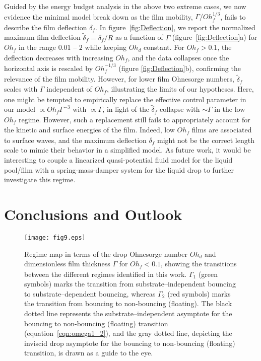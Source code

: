 \documentclass[]{jfm}
\newcommand{\Ohd}{\mathit{Oh}_\mathit{d}}
\newcommand{\Ohf}{\mathit{Oh}_\mathit{f}}
\begin{document}
Guided by the energy budget analysis in the above two extreme cases, we now evidence the minimal model break down as the film mobility, $\Gamma/\Ohf^{1/3}$, fails to describe the film deflection $\delta_f$. 
In figure~\ref{fig:Deflection}, we report the normalized maximum film deflection $\tilde{\delta}_f = \delta_f/R$ as a function of $\Gamma$ (figure~\ref{fig:Deflection}a) for $\Ohf$ in the range $0.01$ -- $2$ while keeping $\Ohd$ constant.
For $\Ohf > 0.1$, the deflection decreases with increasing $\Ohf$, and the data collapses once the horizontal axis is rescaled by $\Ohf^{-1/3}$ (figure \ref{fig:Deflection}b), confirming the relevance of the film mobility.
However, for lower film Ohnesorge numbers, $\tilde{\delta}_f$ scales with $\Gamma$ independent of $\Ohf$, illustrating the limits of our hypotheses.
Here, one might be tempted to empirically replace the effective control parameter in our model $\propto \Ohf\Gamma^{-3}$ with $\propto \Gamma$, in light of the $\tilde{\delta}_f$ collapse with $\sim \Gamma$ in the low $\Ohf$ regime. However, such a replacement still fails to appropriately account for the kinetic and surface energies of the film. Indeed, low $\Ohf$ films are associated to surface waves, and the maximum deflection $\delta_f$ might not be the correct length scale to mimic their behavior in a simplified model. 
As future work, it would be interesting to couple a linearized quasi-potential fluid model \citep{lee2008impact, galeano2017non, galeano2021capillary} for the liquid pool/film with a spring-mass-damper system for the liquid drop to further investigate this regime. 

\section{Conclusions and Outlook}
\label{sec:Conclusions and Outlook}
\begin{figure}
	\centering
	\texttt{[image: fig9.eps]}
	\caption{Regime map in terms of the drop Ohnesorge number $\Ohd$ and dimensionless film thickness $\Gamma$ for $\Ohf < 0.1$, showing the transitions between the different regimes identified in this work. $\Gamma_1$ (green symbols) marks the transition from substrate--independent bouncing to substrate--dependent bouncing, whereas $\Gamma_2$ (red symbols) marks the transition from bouncing to non-bouncing (floating). 
		The black dotted line represents the substrate--independent asymptote for the bouncing to non-bouncing (floating) transition (equation~\eqref{eqn:omega1_2}), and the gray dotted line, depicting the inviscid drop asymptote for the bouncing to non-bouncing (floating) transition, is drawn as a guide to the eye.}
	\label{fig:LowOhfRegime}
\end{figure}
\end{document}
